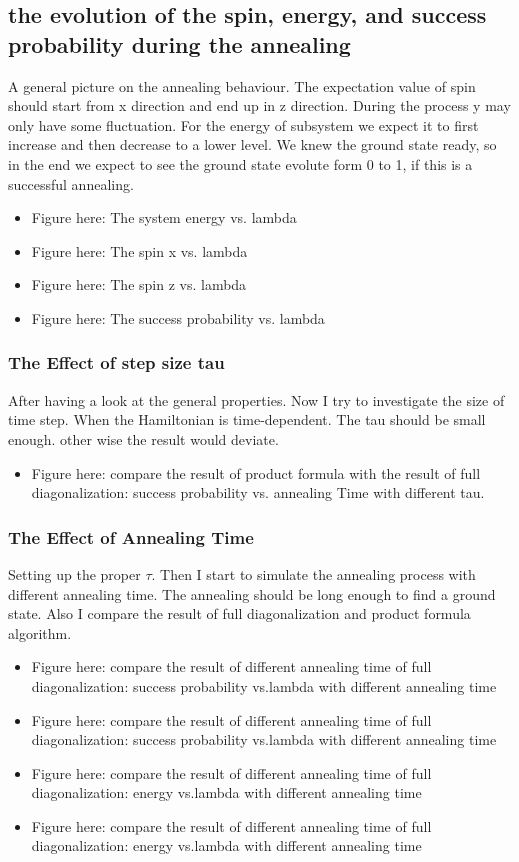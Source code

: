 \documentclass[twoside,a4paper,article]{combine}
\begin{document}
\subsection{the evolution of the spin, energy, and success probability during the annealing}
	A general picture on the annealing behaviour. The expectation value of spin should start from x direction and end up in z direction. During the process y may only have some fluctuation. For the energy of subsystem we expect it to first increase and then decrease to a lower level. We knew the ground state ready, so in the end we expect to see the ground state evolute form 0 to 1, if this is a successful annealing.
	\begin{itemize}
		\item \checkmark Figure here: The system energy vs. lambda
		\item \checkmark Figure here: The spin x vs. lambda
		\item \checkmark Figure here: The spin z vs. lambda
		\item \checkmark Figure here: The success probability vs. lambda
	\end{itemize}
\subsubsection{The Effect of step size tau}
	After having a look at the general properties. Now I try to investigate the size of time step. When the Hamiltonian is time-dependent. The tau should be small enough.  other wise the result would deviate. 
	\begin{itemize}
		\item \checkmark Figure here: compare the result of product formula with the result of full diagonalization: success probability vs. annealing Time with different tau.
	\end{itemize}
\subsubsection{The Effect of Annealing Time}
	Setting up the proper $\tau$. Then I start to simulate the annealing process with different annealing time. The annealing should be long enough to find a ground state. Also I compare the result of full diagonalization and product formula algorithm. 
	\begin{itemize}
		\item Figure here: compare the result of different annealing time of full diagonalization: success probability vs.lambda with different annealing time
		\item \checkmark Figure here: compare the result of different annealing time of full diagonalization: success probability vs.lambda with different annealing time
		\item \checkmark Figure here: compare the result of different annealing time of full diagonalization: energy vs.lambda with different annealing time
		\item \checkmark Figure here: compare the result of different annealing time of full diagonalization: energy vs.lambda with different annealing time
	\end{itemize}
\end{document}
